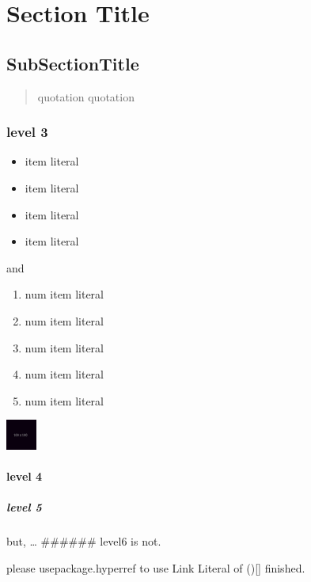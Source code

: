 \section{Section Title}\label{section-title}

\subsection{SubSectionTitle}\label{subsectiontitle}

\begin{quote}
quotation quotation
\end{quote}

\subsubsection{level 3}\label{level-3}

\begin{itemize}
\itemsep1pt\parskip0pt
\item
  item literal
\item
  item literal
\item
  item literal
\item
  item literal
\end{itemize}

and

\begin{enumerate}
\def\labelenumi{\arabic{enumi}.}
\itemsep1pt\parskip0pt
\item
  num item literal
\item
  num item literal
\item
  num item literal
\item
  num item literal
\item
  num item literal
\end{enumerate}

\includegraphics[width=1cm]{figures/sample.png}

\paragraph{level 4}\label{level-4}

\subparagraph{level 5}\label{level-5}

but, \ldots{} \#\#\#\#\#\# level6 is not.

please usepackage.hyperref to use Link Literal of (){[}{]} finished.
